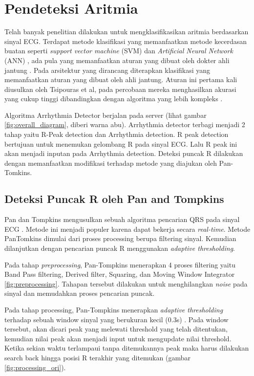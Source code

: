 \documentclass[]{indojc}
\begin{document}
\section{Pendeteksi Aritmia} \label{section:bab3}
Telah banyak penelitian dilakukan untuk mengklasifikasikan aritmia berdasarkan sinyal ECG. Terdapat metode klasifikasi yang memanfaatkan metode kecerdasan buatan seperti \textit{support vector machine} (SVM) \cite{aritmia_svm} dan \textit{Artificial Neural Network} (ANN) \cite{aritmia_ann}, ada pula yang memanfaatkan aturan yang dibuat oleh dokter ahli jantung \cite{tsipouras}. Pada arsitektur yang dirancang diterapkan klasifikasi yang memanfaatkan aturan yang dibuat oleh ahli jantung. Aturan ini pertama kali diusulkan oleh Tsipouras et al, pada percobaan mereka menghasilkan akurasi yang cukup tinggi dibandingkan dengan algoritma yang lebih kompleks \cite{tsipouras}.

Algoritma Arrhythmia Detector berjalan pada server (lihat gambar \ref{fig:overall_diagram}, diberi warna abu). Arrhythmia detector terbagi menjadi 2 tahap yaitu R-Peak detection dan Arrhythmia detection. R peak detection bertujuan untuk menemukan gelombang R pada sinyal ECG. Lalu R peak ini akan menjadi inputan pada Arrhythmia detection. Deteksi puncak R dilakukan dengan memanfaatkan modifikasi terhadap metode yang diajukan oleh Pan-Tomkins.

\subsection{Deteksi Puncak R oleh Pan and Tompkins}
Pan dan Tompkins mengusulkan sebuah algoritma pencarian QRS pada sinyal ECG \cite{pantom}. Metode ini menjadi populer karena dapat bekerja secara \textit{real-time}. Metode PanTomkins dimulai dari proses processing berupa filtering sinyal. Kemudian dilanjutkan dengan pencarian puncak R menggunakan \textit{adaptive thresholding}. 

Pada tahap \textit{preprocessing}, Pan-Tompkins menerapkan 4 proses filtering yaitu Band Pass filtering, Derived filter, Squaring, dan Moving Window Integrator \ref{fig:preprocessing}. Tahapan tersebut dilakukan untuk menghilangkan \textit{noise} pada sinyal dan memudahkan proses pencarian puncak. 

Pada tahap processing, Pan-Tompkins menerapkan \textit{adaptive thresholding} terhadap sebuah window sinyal yang berukuran kecil (0.3s) \cite{pantom}. Pada window tersebut, akan dicari peak yang melewati threshold yang telah ditentukan, kemudian nilai peak akan menjadi input untuk  mengupdate nilai threshold. Ketika sekian waktu terlampaui tanpa ditemukannya peak maka harus dilakukan search back hingga posisi R terakhir yang ditemukan (gambar \ref{fig:processing_ori}).
\end{document}
